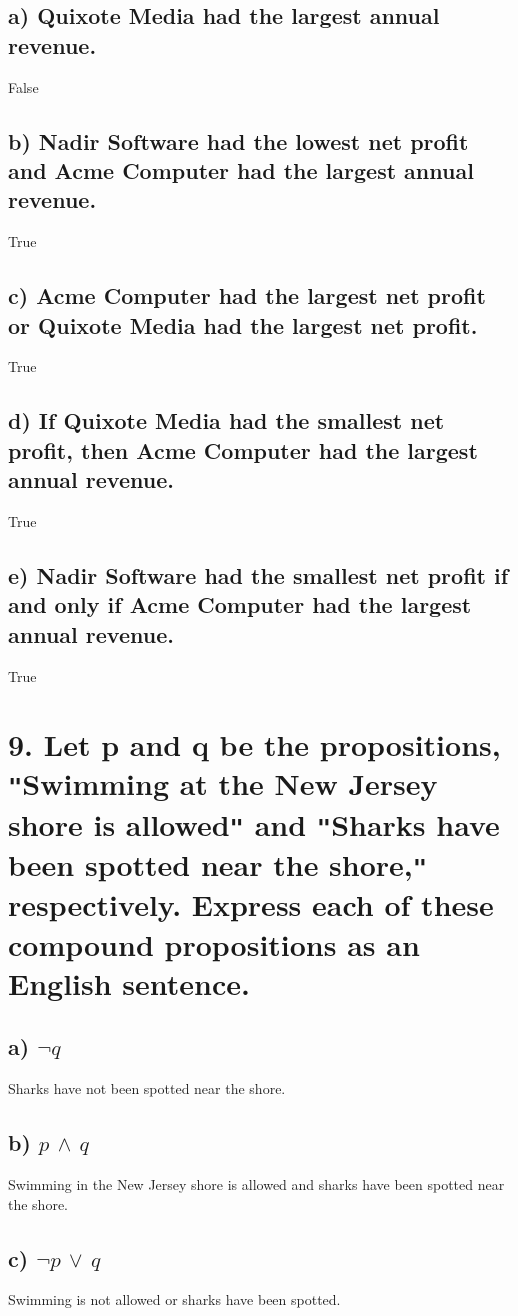 \documentclass[11pt, oneside]{article} %
\numberwithin{equation}{section} %
\numberwithin{figure}{section} %
\numberwithin{table}{section} %
\begin{document}
\subsection{a) Quixote Media had the largest annual revenue.}
False
\subsection{b) Nadir Software had the lowest net profit and Acme Computer had the largest annual revenue.}
True
\subsection{c) Acme Computer had the largest net profit or Quixote Media had the largest net profit.}
True
\subsection{d) If Quixote Media had the smallest net profit, then Acme Computer had the largest annual revenue.}
True
\subsection{e) Nadir Software had the smallest net profit if and only if Acme Computer had the largest annual revenue.}
True


\section{9. Let p and q be the propositions, \texttt{"}Swimming at the New Jersey shore is allowed\texttt{"} and \texttt{"}Sharks have been spotted near the shore,\texttt{"} respectively. Express each of these compound propositions as an English sentence.}
\subsection{a) $\neg$$q$}
Sharks have not been spotted near the shore.
\subsection{b) $p$ $\wedge$ $q$}
Swimming in the New Jersey shore is allowed and sharks have been spotted near the shore.
\subsection{c) $\neg$$p$ $\vee$ $q$}
Swimming is not allowed or sharks have been spotted.
\end{document}
